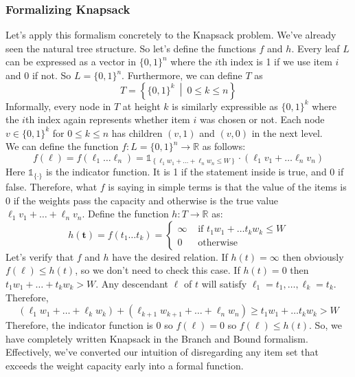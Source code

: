 \documentclass[10pt]{article}
\theoremstyle{plain}
\theoremstyle{definition}
\newcommand{\RR}{\mathbb{R}}
\numberwithin{equation}{section}
\numberwithin{figure}{section}
\begin{document}
\subsubsection{Formalizing Knapsack}
Let's apply this formalism concretely to the Knapsack problem. We've already seen the natural tree structure. So let's define the functions $f$ and $h$. Every leaf $L$ can be expressed as a vector in $\{0,1\}^n$ where the $i$th index is 1 if we use item $i$ and $0$ if not. So $L = \{0, 1\}^n$. Furthermore, we can define $T$ as
\begin{equation}
T = \left \{ \{0,1\}^k \ \middle \vert \ 0 \leq k \leq n \right\}
\end{equation}
Informally, every node in $T$ at height $k$ is similarly expressible as $\{0, 1\}^k$ where the $i$th index again represents whether item $i$ was chosen or not. Each node $v \in \{0, 1\}^k$ for $0 \leq k \leq n$ has children $(v, 1)$ and $(v,0)$ in the next level. \\

\noindent We can define the function $f : L = \{0,1\}^n \rightarrow \RR$ as follows:
\begin{equation}
f(\mathbf{\ell}) = f(\ell_1 \ldots \ell_n) = \mathds{1}_{\displaystyle \left\{ \ell_1 w_1 + \ldots + \ell_n w_n \leq W \right \}} \cdot \left( \ell_1 v_1 + \ldots \ell_n v_n \right)
\end{equation}
Here $\mathds{1}_{\{\cdot\}}$ is the indicator function. It is 1 if the statement inside is true, and 0 if false. Therefore, what $f$ is saying in simple terms is that the value of the items is $0$ if the weights pass the capacity and otherwise is the true value $\ell_1 v_1 + \ldots + \ell_n v_n$. Define the function $h: T \rightarrow \RR$ as:
\begin{equation}
h(\mathbf{t}) = f(t_1 \ldots t_k) = \begin{cases} \infty & \text{ if } t_1 w_1 + \ldots t_k w_k \leq W \\ 0 & \text{ otherwise } \end{cases}
\end{equation}
Let's verify that $f$ and $h$ have the desired relation. If $h(t) = \infty$ then obviously $f(\ell) \leq h(t)$, so we don't need to check this case. If $h(t) = 0$ then $t_1 w_1 + \ldots + t_k w_k > W$. Any descendant $\ell$ of $t$ will satisfy $\ell_1 = t_1, \ldots, \ell_k = t_k$. Therefore,
\begin{equation}
(\ell_1 w_1 + \ldots + \ell_k w_k) + (\ell_{k+1} w_{k+1} + \ldots + \ell_n w_n) \geq t_1 w_1 + \ldots t_k w_k > W
\end{equation}
Therefore, the indicator function is $0$ so $f(\ell) = 0$ so $f(\ell) \leq h(t)$. So, we have completely written Knapsack in the Branch and Bound formalism. Effectively, we've converted our intuition of disregarding any item set that exceeds the weight capacity early into a formal function. 
\end{document}
